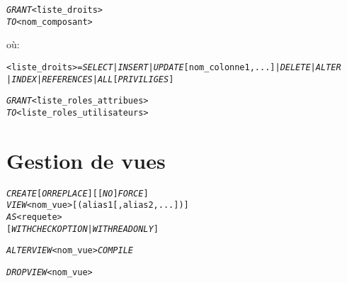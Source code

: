 \documentclass[10pt]{article}
\begin{document}
		\begin{alltt}
			\begin{tabbing}
				\emph{GRANT} \= <liste_droits>\\
				\emph{TO} \> <nom_composant>\\
				[\emph{WITH GRANT OPTION}]
			\end{tabbing}
		\end{alltt}
		
		où:
		\begin{alltt}
			\begin{tabbing}
				<liste_droits> =\= \emph{SELECT} | \emph{INSERT} | \emph{UPDATE} [nom_colonne1,...] | \emph{DELETE} | \emph{ALTER} \\
							\> | \emph{INDEX} | \emph{REFERENCES} | \emph{ALL} [\emph{PRIVILIGES}]
			\end{tabbing}
		\end{alltt}
		
		\begin{alltt}
			\begin{tabbing}
				\emph{GRANT} \= <liste_roles_attribues>\\
				\emph{TO} \> <liste_roles_utilisateurs>\\
				[\emph{WITH ADMIN OPTION}]
			\end{tabbing}
		\end{alltt}
		
	\section{Gestion de vues}
		\begin{alltt}
			\emph{CREATE} [\emph{OR REPLACE}] [[\emph{NO}] \emph{FORCE}]
			\emph{VIEW} <nom_vue> [(alias1[,alias2,...])]
			\emph{AS} <requete>
			[\emph{WITH CHECK OPTION} | \emph{WITH READ ONLY}]
			
			\emph{ALTER VIEW} <nom_vue> \emph{COMPILE}
			
			\emph{DROP VIEW} <nom_vue>
		\end{alltt}
\end{document}
